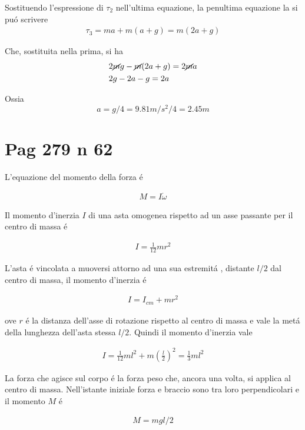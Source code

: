 \documentclass[17pt]{extarticle}
\begin{document}
Sostituendo l'espressione di $\tau_2$ nell'ultima equazione, la penultima equazione la si pu\'o scrivere
\begin{eqnarray}
	\tau_3 = ma + m(a+g) = m(2a+g)
\end{eqnarray}

Che, sostituita nella prima, si ha
\begin{eqnarray}
	\nonumber & 2\cancel{m}g -\cancel{m}(2a+g)=2\cancel{m}a\\
	& 2g -2a - g = 2a
\end{eqnarray}

Ossia
\begin{equation}
	a = g/4 = 9.81m/s^2/4 = 2.45m
\end{equation}

\section{Pag 279 n 62}

L'equazione del momento della forza \'e 

\begin{eqnarray}
	M = I\dot{\omega}
\end{eqnarray}

Il momento d'inerzia $I$ di una asta omogenea rispetto ad un asse passante per il centro di massa \'e 

\begin{eqnarray}
	I = \frac{1}{12}mr^2
\end{eqnarray}

L'asta \'e vincolata a muoversi attorno ad una sua estremit\'a , distante $l/2$ dal centro di massa, il momento d'inerzia \'e

\begin{eqnarray}
	I = I_{cm} + mr^2
\end{eqnarray}

ove $r$ \'e la distanza dell'asse di rotazione rispetto al centro di massa e vale la met\'a della lunghezza dell'asta stessa $l/2$. Quindi il momento d'inerzia vale

\begin{eqnarray}
	I = \frac{1}{12}ml^2 + m\left(\frac{l}{2}\right)^2 = \frac{1}{3}ml^2
\end{eqnarray}


La forza che agisce sul corpo \'e la forza peso che, ancora una volta, si applica al centro di massa. Nell'istante iniziale forza e braccio sono tra loro perpendicolari e il momento $M$ \'e

\begin{eqnarray}\label{eq:momento}
	M = mgl/2
\end{eqnarray}
\end{document}
